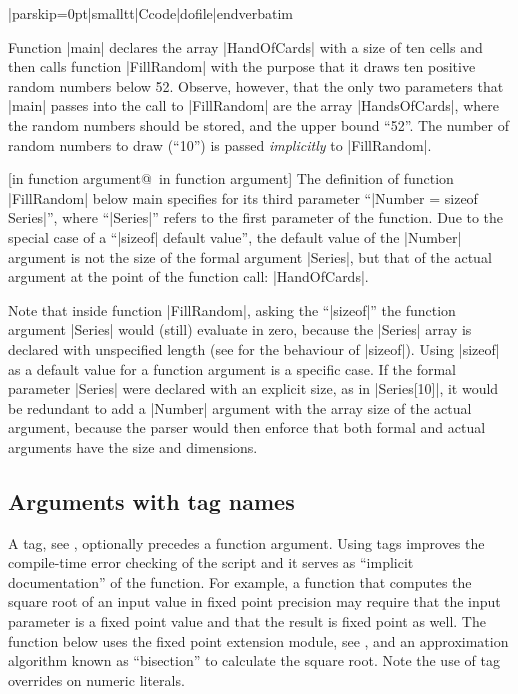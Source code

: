 \bigskip{}
\verbatim|parskip=0pt|smalltt|Ccode|dofile|endverbatim\endlistingx

\noindent{}%
Function |main| declares the array |HandOfCards| with a size of ten cells and
then calls function |FillRandom| with the purpose that it draws ten positive
random numbers below 52. Observe, however, that the only two parameters that
|main| passes into the call to |FillRandom| are the array |HandsOfCards|, where
the random numbers should be stored, and the upper bound ``52''. The number of
random numbers to draw (``10'') is passed {\it implicitly\/} to |FillRandom|.

[in function argument@\midtilde\ in function argument]
The definition of function |FillRandom| below main specifies for its third
parameter ``|Number = sizeof Series|'', where ``|Series|'' refers to the first
parameter of the function. Due to the special case of a ``|sizeof| default value'',
the default value of the |Number| argument is not the size of the formal
argument |Series|, but that of the actual argument at the point of the
function call: |HandOfCards|.

Note that inside function |FillRandom|, asking the ``|sizeof|'' the function
argument |Series| would (still) evaluate in zero, because the |Series| array is
declared with unspecified length (see  for the behaviour of
|sizeof|). Using |sizeof| as a default value for a function argument is a
specific case. If the formal parameter |Series| were declared with an explicit
size, as in |Series[10]|, it would be redundant to add a |Number| argument with
the array size of the actual argument, because the parser would then enforce
that both formal and actual arguments have the size and dimensions.


\subsection{Arguments with tag names}
A tag, see , optionally precedes a function argument. Using
tags improves the compile-time error checking of the script and it serves
as ``implicit documentation'' of the function.  For example, a function that
computes the square root of an input value in fixed point precision may require
that the input parameter is a fixed point value and that the result is fixed
point as well. The function below uses the fixed point extension module, see
, and an approximation algorithm known as ``bisection'' to
calculate the square root. Note the use of tag overrides on numeric
literals.

